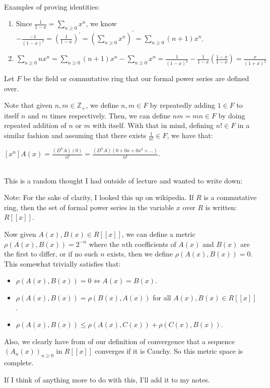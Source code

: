\documentclass{book}
\newcommand{\hOne}{%
   \color{Black}%
   \fontsize{14}{16}\selectfont%
}
\newcommand{\exOne}{%
   \color{Purple}%
   \fontsize{13}{15}\selectfont%
}
\newcommand{\exTwoP}{%
   \color{RedViolet}%
   \fontsize{13}{15}\selectfont%
}
\newcommand{\exPP}{%
   \color{RedViolet}%
   \fontsize{12}{14}\selectfont%
}
\newenvironment{myIndent}{%
   \begin{adjustwidth}{2.5em}{0em}%
}{%
   \end{adjustwidth}%
}
\newcommand{\mySepTwo}[1][.]{%
   {\noindent\color{#1}{\rule{6.5in}{0.5mm}}}\\%
}
\newcommand{\retTwo}{\hfill\bigbreak}
\begin{document}
\exOne\mySepTwo

Examples of proving identities:\\ [-10pt]

\exPP
\begin{enumerate}
   \item Since $\frac{1}{1-x} = \sum\limits_{n \geq 0}x^n$, we know $-\frac{-1}{(1-x)^2} = (\frac{1}{1-x})^\prime = \left(\sum\limits_{n \geq 0}x^n\right)^\prime = \sum\limits_{n \geq 0}(n + 1)x^n$.
   \item $\sum\limits_{n \geq 0}nx^n = \sum\limits_{n \geq 0}(n + 1)x^n - \sum\limits_{n \geq 0}x^n = \frac{1}{(1-x)^2} - \frac{1}{1-x}\left(\frac{1-x}{1-x}\right) = \frac{x}{(1 + x)^2}$\newpage
\end{enumerate}

\hOne
Let $F$ be the field or commutative ring that our formal power series are defined over.\retTwo

Note that given $n, m \in \mathbb{Z}_+$, we define $n, m \in F$ by repeatedly adding $1 \in F$ to itself $n$ and $m$ times respectively. Then, we can define $nm = mn \in F$ by doing repeated addition of $n$ or $m$ with itself. With that in mind, defining $n! \in F$ in a similar fashion and assuming that there exists $\frac{1}{n!} \in F$, we have that:

{\centering $[x^n]A(x) = \frac{(D^nA)(0)}{n!} = \frac{(D^nA)(0 + 0x + 0x^2 + \ldots)}{n!}$.\retTwo\par}

\exOne\mySepTwo

This is a random thought I had outside of lecture and wanted to write down:

\begin{myIndent}\exTwoP
   Note: For the sake of clarity, I looked this up on wikipedia. If $R$ is a commutative ring, then the set of formal power series in the variable $x$ over $R$ is written: $R[[x]]$.\retTwo

   Now given $A(x), B(x) \in R[[x]]$, we can define a metric $\rho(A(x), B(x)) = 2^{-n}$ where the $n$th coefficients of $A(x)$ and $B(x)$ are the first to differ, or if no such $n$ exists, then we define $\rho(A(x), B(x)) = 0$. This somewhat trivially satisfies that:
   \begin{itemize}
      \item $\rho(A(x), B(x)) = 0 \Longleftrightarrow A(x) = B(x)$.
      \item $\rho(A(x), B(x)) = \rho(B(x), A(x))$ for all $A(x), B(x) \in R[[x]]$.
      \item $\rho(A(x), B(x)) \leq \rho(A(x), C(x)) + \rho(C(x), B(x))$.\retTwo
   \end{itemize}

   Also, we clearly have from of our definition of convergence that a sequence\\ $(A_n(x))_{n \geq 0}$ in $R[[x]]$ converges if it is Cauchy. So this metric space is complete.\retTwo

   If I think of anything more to do with this, I'll add it to my notes.
\end{myIndent}
\end{document}
